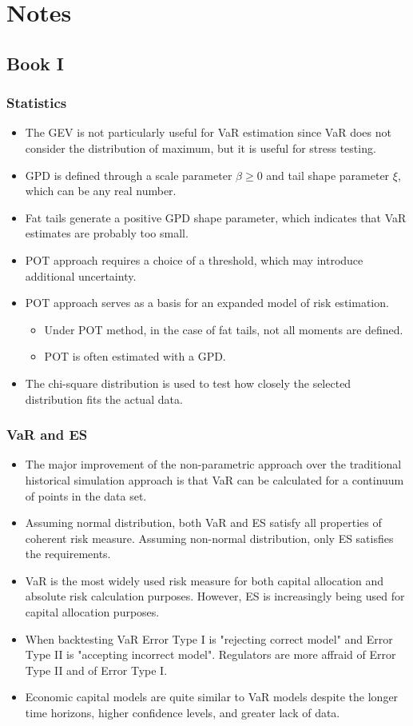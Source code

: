\chapter{Notes}

\section{Book I}

\subsection{Statistics}
\begin{itemize}
	\item The GEV is not particularly useful for VaR estimation since VaR does not consider the distribution of maximum, but it is useful for stress testing.
	\item GPD is defined through a scale parameter $\beta \ge 0$ and tail shape parameter $\xi$, which can be any real number.
	\item Fat tails generate a positive GPD shape parameter, which indicates that VaR estimates are probably too small.
	\item POT approach requires a choice of a threshold, which may introduce additional uncertainty.
	\item POT approach serves as a basis for an expanded model of risk estimation.
	\begin{itemize}
		\item Under POT method, in the case of fat tails, not all moments are defined.
		\item POT is often estimated with a GPD.
	\end{itemize}
	\item The chi-square distribution is used to test how closely the selected distribution fits the actual data.
\end{itemize}
\subsection{VaR and ES}
\begin{itemize}
	\item The major improvement of the non-parametric approach over the traditional historical simulation approach is that VaR can be calculated for a continuum of points in the data set.
	\item Assuming normal distribution, both VaR and ES satisfy all properties of coherent risk measure. Assuming non-normal distribution, only ES satisfies the requirements.
	\item VaR is the most widely used risk measure for both capital allocation and absolute risk calculation purposes. However, ES is increasingly being used for capital allocation purposes.
	\item When backtesting VaR Error Type I is "rejecting correct model" and Error Type II is "accepting incorrect model". 
	Regulators are more affraid of Error Type II and of Error Type I.
	\item Economic capital models are quite similar to VaR models despite the longer time horizons, higher confidence levels, and greater lack of data.
\end{itemize}

